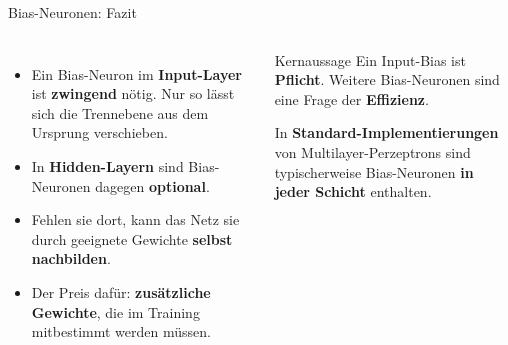 \begin{frame}{Bias-Neuronen: Fazit}
\begin{columns}
\begin{itemize}
  \item Ein Bias-Neuron im \textbf{Input-Layer} ist \textbf{zwingend}
        nötig. Nur so lässt sich die Trennebene aus dem Ursprung
        verschieben.
  \item In \textbf{Hidden-Layern} sind Bias-Neuronen dagegen \textbf{optional}.
  \item Fehlen sie dort, kann das Netz sie durch geeignete Gewichte
        \textbf{selbst nachbilden}.
  \item Der Preis dafür: \textbf{zusätzliche Gewichte}, die im Training
        mitbestimmt werden müssen.
\end{itemize}

\begin{blockC1}{Kernaussage}
Ein Input-Bias ist \textbf{Pflicht}. Weitere Bias-Neuronen sind eine Frage
der \textbf{Effizienz}.\par
\medskip
In \textbf{Standard-Implementierungen} von Multilayer-Perzeptrons sind typischerweise Bias-Neuronen \textbf{in jeder Schicht} enthalten.

\end{blockC1}
\end{columns}
\end{frame}


